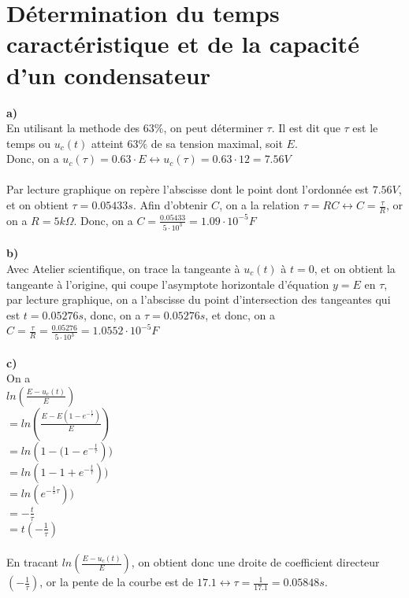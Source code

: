 \documentclass{article}
\begin{document}
\section{Détermination du temps caractéristique et de la capacité d'un condensateur}

\large{\textbf{a)}} \\
En utilisant la methode des $63\%$, on peut déterminer $\tau$. Il est dit que $\tau$ est le temps ou $u_c(t)$ atteint $63\%$ de sa tension maximal, soit $E$. \\
Donc, on a $u_c(\tau) = 0.63 \cdot E \leftrightarrow u_c(\tau) = 0.63 \cdot 12 = 7.56V$ \\ \\
Par lecture graphique on repère l'abscisse dont le point dont l'ordonnée est $7.56V$, et on obtient $\tau = 0.05433 s$. Afin d'obtenir $C$, on a la relation $\tau = RC \leftrightarrow C = \frac{\tau}{R}$, or on a $R = 5k\Omega$. Donc, on a $C = \frac{0.05433}{5 \cdot 10^3} = 1.09 \cdot 10^{-5}F$ \\ \\
\large{\textbf{b)}} \\
Avec Atelier scientifique, on trace la tangeante à $u_c(t)$ à $t = 0$, et on obtient la tangeante à l'origine, qui coupe l'asymptote horizontale d'équation $y = E$ en $\tau$, par lecture graphique, on a l'abscisse du point d'intersection des tangeantes qui est $t = 0.05276 s$, donc, on a $\tau = 0.05276 s$, et donc, on a $C = \frac{\tau}{R} = \frac{0.05276}{5 \cdot 10^3} = 1.0552 \cdot 10^{-5} F$ \\ \\
\large{\textbf{c)}} \\
On a \\

$ln({\frac{E - u_c(t)}{E}})$ \\
$= ln({\frac{E - E(1-e^{-\frac{t}{\tau}})}{E}})$ \\
$= ln({1 - (1-e^{-\frac{t}{\tau}}}))$ \\
$= ln({1 - 1 + e^{-\frac{t}{\tau}}}))$ \\
$= ln({e^{-\frac{t}''\tau}}))$ \\
$= -\frac{t}{\tau}$ \\
$= t ({-\frac{1}{\tau}})$ \\
\\

En tracant $ln({\frac{E - u_c(t)}{E}})$, on obtient donc une droite de coefficient directeur $({-\frac{1}{\tau}})$, or la pente de la courbe est de $17.1 \leftrightarrow \tau = \frac{1}{17.1} = 0.05848 s$. \\
\end{document}
